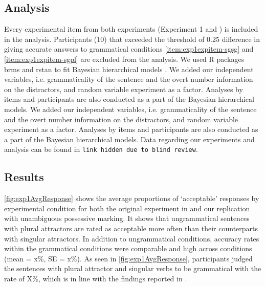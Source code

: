 \documentclass[doc,a4paper,man,natbib,floatsintext,noextraspace]{apa6}\usepackage[]{graphicx}\usepackage[]{color}
\begin{document}
\subsection{Analysis} \label{sec:exp1:analysis}

Every experimental item from both experiments (Experiment 1 and \citet{LagoEtAl:2018}) is included in the analysis. Participants (10) that exceeded the threshold of 0.25 difference in giving accurate answers to grammatical conditions \ref{item:exp1expitem-sgsg} and \ref{item:exp1expitem-sgpl} are excluded from the analysis. We used R packages brms \citep{R-brms_b} and rstan \citep{R-stan} to fit Bayesian hierarchical models \citep{GelmanHill:2007}. We added our independent variables, i.e. grammaticality of the sentence and the overt number information on the distractors, and random variable experiment as a factor. Analyses by items and participants are also conducted as a part of the Bayesian hierarchical models. We added our independent variables, i.e. grammaticality of the sentence and the overt number information on the distractors, and random variable experiment as a factor. Analyses by items and participants are also conducted as a part of the Bayesian hierarchical models.
Data regarding our experiments and analysis can be found in \texttt{link hidden due to blind review}.



\subsection{Results} \label{sec:exp1:results}


\autoref{fig:exp1AvgResponse} shows the average proportions of ‘acceptable’ responses by experimental condition for both the original experiment in \citet{LagoEtAl:2018} and our replication with unambiguous possessive marking. It shows that ungrammatical sentences with plural attractors are rated as acceptable more often than their counterparts with singular attractors. In addition to ungrammatical conditions, accuracy rates within the grammatical conditions were comparable and high across conditions (mean = x\%, SE = x\%). As seen in \autoref{fig:exp1AvgResponse}, participants judged the sentences with plural attractor and singular verbs to be grammatical with the rate of X\%, which is in line with the findings reported in \citet{LagoEtAl:2018}.    
\end{document}
